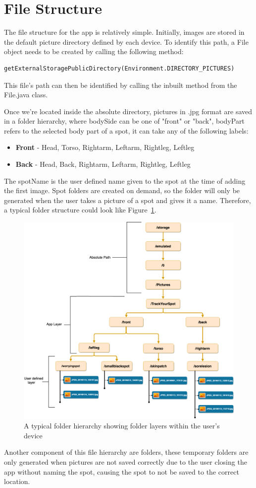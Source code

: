 \section{File Structure} \label{sec:filestructure}
The file structure for the app is relatively simple. Initially, images are stored in the default picture directory defined by each device. To identify this path, a File object needs to be created by calling the following method: \begin{verbatim}
getExternalStoragePublicDirectory(Environment.DIRECTORY_PICTURES)
\end{verbatim}
This file's path can then be identified by calling the inbuilt  method from the File.java class. 

\par Once we're located inside the absolute directory, pictures in .jpg format are saved in a 
folder hierarchy, where bodySide can be one of "front" or "back", bodyPart refers to the selected body part of a spot, it can take any of the following labels:
\begin{itemize}
    \item \textbf{Front} - Head, Torso, Rightarm, Leftarm, Rightleg, Leftleg
    \item \textbf{Back} - Head, Back, Rightarm, Leftarm, Rightleg, Leftleg
\end{itemize}
The spotName is the user defined name given to the spot at the time of adding the first image. Spot folders are created on demand, so the  folder will only be generated when the user takes a picture of a spot and gives it a name. Therefore, a typical folder structure could look like Figure~\ref{fig:filestructure.png}.
\begin{figure}
    \includegraphics[width=1.2\textwidth, center]{figures/filestructure.png}
    \caption{A typical folder hierarchy showing folder layers within the user's device}
    \label{fig:filestructure.png}
\end{figure}
\par Another component of this file hierarchy are  folders, these temporary folders are only generated when pictures are not saved correctly due to the user closing the app without naming the spot, causing the spot to not be saved to the correct location.